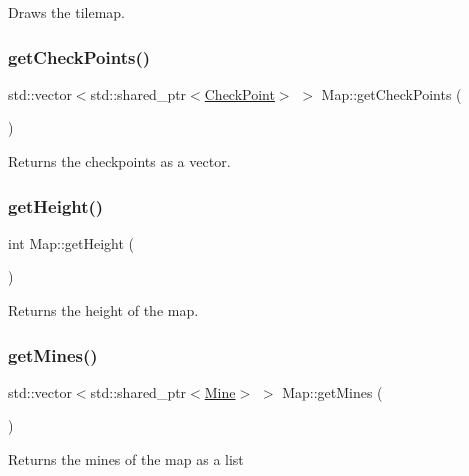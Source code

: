 Draws the tilemap. \hypertarget{classMap_a5de4ef4f3422d815f28d8e609964a449}{}\label{classMap_a5de4ef4f3422d815f28d8e609964a449} 
\subsubsection{\texorpdfstring{get\+Check\+Points()}{getCheckPoints()}}
{\footnotesize\ttfamily std\+::vector$<$std\+::shared\+\_\+ptr$<$\hyperlink{classCheckPoint}{Check\+Point}$>$ $>$ Map\+::get\+Check\+Points (\begin{DoxyParamCaption}{ }\end{DoxyParamCaption})\hspace{0.3cm}{\ttfamily [inline]}}

Returns the checkpoints as a vector. \hypertarget{classMap_a2b09c8875af2efb711fc3a022e70427d}{}\label{classMap_a2b09c8875af2efb711fc3a022e70427d} 
\subsubsection{\texorpdfstring{get\+Height()}{getHeight()}}
{\footnotesize\ttfamily int Map\+::get\+Height (\begin{DoxyParamCaption}{ }\end{DoxyParamCaption})\hspace{0.3cm}{\ttfamily [inline]}}

Returns the height of the map. \hypertarget{classMap_a5c116280551e3b49145e7d30d392c429}{}\label{classMap_a5c116280551e3b49145e7d30d392c429} 
\subsubsection{\texorpdfstring{get\+Mines()}{getMines()}}
{\footnotesize\ttfamily std\+::vector$<$std\+::shared\+\_\+ptr$<$\hyperlink{classMine}{Mine}$>$ $>$ Map\+::get\+Mines (\begin{DoxyParamCaption}{ }\end{DoxyParamCaption})\hspace{0.3cm}{\ttfamily [inline]}}

Returns the mines of the map as a list \hypertarget{classMap_ae1ab0f7883bad946493c6a7f896966f0}{}\label{classMap_ae1ab0f7883bad946493c6a7f896966f0} 

